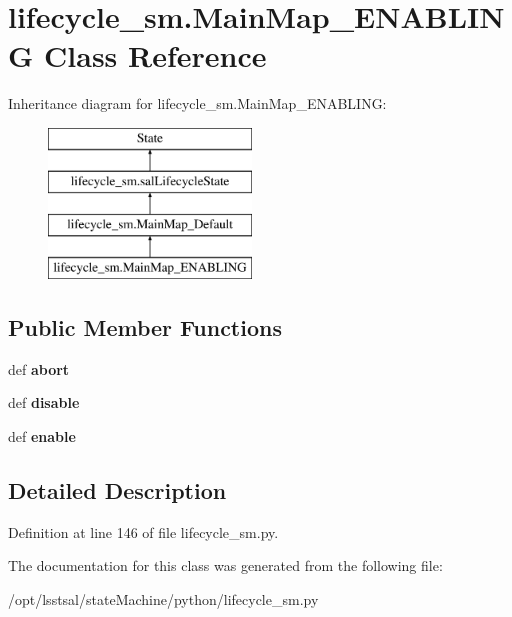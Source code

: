\hypertarget{classlifecycle__sm_1_1_main_map___e_n_a_b_l_i_n_g}{\section{lifecycle\-\_\-sm.\-Main\-Map\-\_\-\-E\-N\-A\-B\-L\-I\-N\-G Class Reference}
\label{classlifecycle__sm_1_1_main_map___e_n_a_b_l_i_n_g}
}
Inheritance diagram for lifecycle\-\_\-sm.\-Main\-Map\-\_\-\-E\-N\-A\-B\-L\-I\-N\-G\-:\begin{figure}[H]
\begin{center}
\leavevmode
\includegraphics[height=4.000000cm]{classlifecycle__sm_1_1_main_map___e_n_a_b_l_i_n_g}
\end{center}
\end{figure}
\subsection*{Public Member Functions}
\begin{DoxyCompactItemize}
\item 
\hypertarget{classlifecycle__sm_1_1_main_map___e_n_a_b_l_i_n_g_a98140fb22898bd420ea6f14621eb16b1}{def {\bfseries abort}}\label{classlifecycle__sm_1_1_main_map___e_n_a_b_l_i_n_g_a98140fb22898bd420ea6f14621eb16b1}

\item 
\hypertarget{classlifecycle__sm_1_1_main_map___e_n_a_b_l_i_n_g_a2872aabc5671df8d5be7add88643c9b4}{def {\bfseries disable}}\label{classlifecycle__sm_1_1_main_map___e_n_a_b_l_i_n_g_a2872aabc5671df8d5be7add88643c9b4}

\item 
\hypertarget{classlifecycle__sm_1_1_main_map___e_n_a_b_l_i_n_g_a0fc0318874ec803e3f663a29095af028}{def {\bfseries enable}}\label{classlifecycle__sm_1_1_main_map___e_n_a_b_l_i_n_g_a0fc0318874ec803e3f663a29095af028}

\end{DoxyCompactItemize}


\subsection{Detailed Description}


Definition at line 146 of file lifecycle\-\_\-sm.\-py.



The documentation for this class was generated from the following file\-:\begin{DoxyCompactItemize}
\item 
/opt/lsstsal/state\-Machine/python/lifecycle\-\_\-sm.\-py\end{DoxyCompactItemize}
